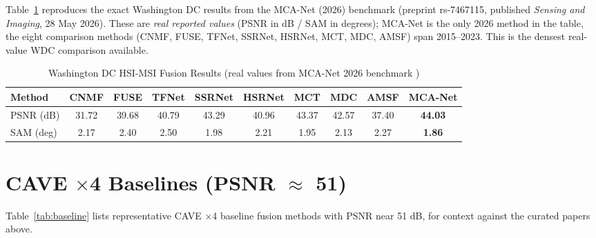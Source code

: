 \documentclass[conference]{IEEEtran}
\begin{document}
Table~\ref{tab:wdcbench} reproduces the exact Washington DC results from the MCA-Net (2026)
benchmark \cite{mcanet2026} (preprint rs-7467115, published \emph{Sensing and Imaging}, 28 May 2026).
These are \emph{real reported values} (PSNR in dB / SAM in degrees); MCA-Net is the only 2026 method
in the table, the eight comparison methods (CNMF, FUSE, TFNet, SSRNet, HSRNet, MCT, MDC, AMSF) span
2015--2023. This is the densest real-value WDC comparison available.

\begin{table}[htbp]
\caption{Washington DC HSI-MSI Fusion Results (real values from MCA-Net 2026 benchmark \cite{mcanet2026})}
\label{tab:wdcbench}
\begin{center}
\begin{adjustbox}{width=\textwidth}
\begin{tabular}{lccccccccc}
\toprule
\textbf{Method} & \textbf{CNMF} & \textbf{FUSE} & \textbf{TFNet} & \textbf{SSRNet} & \textbf{HSRNet} & \textbf{MCT} & \textbf{MDC} & \textbf{AMSF} & \textbf{MCA-Net} \\
\midrule
PSNR (dB) & 31.72 & 39.68 & 40.79 & 43.29 & 40.96 & 43.37 & 42.57 & 37.40 & \textbf{44.03} \\
SAM (deg) & 2.17 & 2.40 & 2.50 & 1.98 & 2.21 & 1.95 & 2.13 & 2.27 & \textbf{1.86} \\
\bottomrule
\end{tabular}
\end{adjustbox}
\end{center}
\end{table}

\section{CAVE $\times$4 Baselines (PSNR $\approx$ 51)}

Table~\ref{tab:baseline} lists representative CAVE $\times$4 baseline fusion methods with PSNR near 51 dB, for context against the curated papers above.
\end{document}
